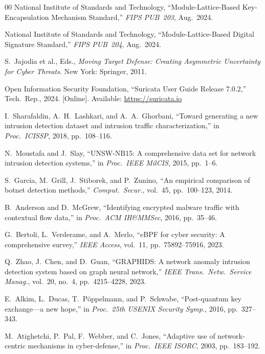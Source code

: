 \documentclass{ieeeaccess}
\renewcommand{\_}{\textunderscore\allowbreak}
\begin{document}
\begin{thebibliography}{00}
National Institute of Standards and Technology, ``Module-Lattice-Based
Key-Encapsulation Mechanism Standard,'' \emph{FIPS PUB~203}, Aug.~2024.

National Institute of Standards and Technology, ``Module-Lattice-Based Digital
Signature Standard,'' \emph{FIPS PUB~204}, Aug.~2024.

S.~Jajodia et al., Eds., \emph{Moving Target Defense: Creating Asymmetric
Uncertainty for Cyber Threats}. New York: Springer, 2011.

Open Information Security Foundation, ``Suricata User Guide Release 7.0.2,''
Tech.\ Rep., 2024. [Online]. Available: \url{https://suricata.io}

I.~Sharafaldin, A.~H.~Lashkari, and A.~A.~Ghorbani, ``Toward generating a new
intrusion detection dataset and intrusion traffic characterization,''
in \emph{Proc.\ ICISSP}, 2018, pp.~108--116.

N.~Moustafa and J.~Slay, ``UNSW-NB15: A comprehensive data set for network
intrusion detection systems,'' in \emph{Proc.\ IEEE MilCIS}, 2015, pp.~1--6.

S.~Garcia, M.~Grill, J.~Stiborek, and P.~Zunino, ``An empirical comparison of
botnet detection methods,'' \emph{Comput.\ Secur.}, vol.~45, pp.~100--123, 2014.

B.~Anderson and D.~McGrew, ``Identifying encrypted malware traffic with contextual
flow data,'' in \emph{Proc.\ ACM IH\&MMSec}, 2016, pp.~35--46.

G.~Bertoli, L.~Verderame, and A.~Merlo, ``eBPF for cyber security: A comprehensive
survey,'' \emph{IEEE Access}, vol.~11, pp.~75892--75916, 2023.

Q.~Zhao, J.~Chen, and D.~Guan, ``GRAPHIDS: A network anomaly intrusion detection
system based on graph neural network,'' \emph{IEEE Trans.\ Netw.\ Service Manag.},
vol.~20, no.~4, pp.~4215--4228, 2023.

E.~Alkim, L.~Ducas, T.~P{\"o}ppelmann, and P.~Schwabe, ``Post-quantum key
exchange---a new hope,'' in \emph{Proc.\ 25th USENIX Security Symp.}, 2016,
pp.~327--343.

M.~Atighetchi, P.~Pal, F.~Webber, and C.~Jones, ``Adaptive use of network-centric
mechanisms in cyber-defense,'' in \emph{Proc.\ IEEE ISORC}, 2003, pp.~183--192.


\end{thebibliography}
\end{document}
